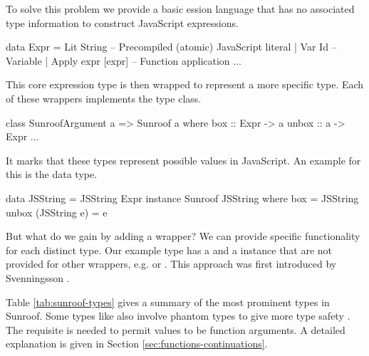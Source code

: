 To solve this problem we provide a basic ession 
language that has no associated type information to construct 
JavaScript expressions.
\begin{Code}
data Expr 
  = Lit String -- Precompiled (atomic) JavaScript literal
  | Var Id     -- Variable
  | Apply expr [expr]    -- Function application
  ...
\end{Code}
This core expression type is then wrapped to represent a more specific 
type. Each of these wrappers implements the  type 
class.
\begin{Code}
class SunroofArgument a => Sunroof a where
  box :: Expr -> a
  unbox :: a -> Expr
  ...
\end{Code}
It marks that these types represent possible values in JavaScript.
An example for this is the  data type.
\begin{Code}
data JSString = JSString Expr
instance Sunroof JSString where
  box = JSString
  unbox (JSString e) = e
\end{Code}
But what do we gain by adding a wrapper? We can
provide specific functionality for each distinct type.
Our example type  has a  and a 
 instance that are not provided for other 
wrappers, e.g.  or .
This approach was first introduced by 
Svenningsson \cite{Svenningsson:12:CombiningEmbedding}.

Table \ref{tab:sunroof-types} gives a summary of the 
most prominent types in Sunroof. Some types like  also involve 
phantom types to give more type safety \cite{Cheney:03:FirstClassPhantomTypes}.
The requisite  is needed to permit values
to be function arguments. A detailed explanation is given in 
Section \ref{sec:functions-continuations}.





